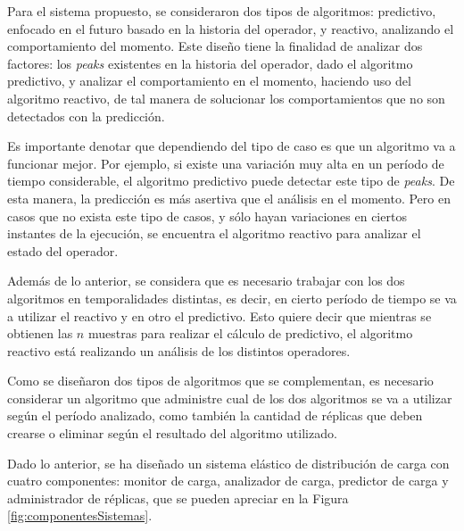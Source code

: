 Para el sistema propuesto, se consideraron dos tipos de algoritmos: predictivo, enfocado en el futuro basado en la historia del operador, y reactivo, analizando el comportamiento del momento. Este diseño tiene la finalidad de analizar dos factores: los \textit{peaks} existentes en la historia del operador, dado el algoritmo predictivo, y analizar el comportamiento en el momento, haciendo uso del algoritmo reactivo, de tal manera de solucionar los comportamientos que no son detectados con la predicción.

Es importante denotar que dependiendo del tipo de caso es que un algoritmo va a funcionar mejor. Por ejemplo, si existe una variación muy alta en un período de tiempo considerable, el algoritmo predictivo puede detectar este tipo de \textit{peaks}. De esta manera, la predicción es más asertiva que el análisis en el momento. Pero en casos que no exista este tipo de casos, y sólo hayan variaciones en ciertos instantes de la ejecución, se encuentra el algoritmo reactivo para analizar el estado del operador.

Además de lo anterior, se considera que es necesario trabajar con los dos algoritmos en temporalidades distintas, es decir, en cierto período de tiempo se va a utilizar el reactivo y en otro el predictivo. Esto quiere decir que mientras se obtienen las $n$ muestras para realizar el cálculo de predictivo, el algoritmo reactivo está realizando un análisis de los distintos operadores.


Como se diseñaron dos tipos de algoritmos que se complementan, es necesario considerar un algoritmo que administre cual de los dos algoritmos se va a utilizar según el período analizado, como también la cantidad de réplicas que deben crearse o eliminar según el resultado del algoritmo utilizado.

Dado lo anterior, se ha diseñado un sistema elástico de distribución de carga con cuatro componentes: monitor de carga, analizador de carga, predictor de carga y administrador de réplicas, que se pueden apreciar en la Figura \ref{fig:componentesSistemas}.

